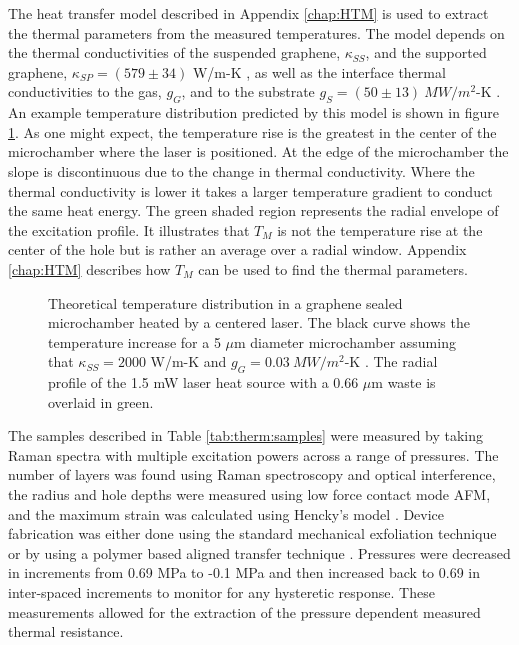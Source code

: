 The heat transfer model described in Appendix \ref{chap:HTM} is used to extract the thermal parameters from the measured temperatures.
The model depends on the thermal conductivities of the suspended graphene, $\kappa_{SS}$, and the supported graphene, $\kappa_{SP}=(579 \pm 34)$ W/m-K \cite{Seol2010}, as well as the interface thermal conductivities to the gas, $g_G$, and to the substrate $g_S=(50 \pm 13) \ MW/m^2$-K \cite{Mak2010}.
An example temperature distribution predicted by this model is shown in figure \ref{fig:therm:HTPlot}.
As one might expect, the temperature rise is the greatest in the center of the microchamber where the laser is positioned.
At the edge of the microchamber the slope is discontinuous due to the change in thermal conductivity.
Where the thermal conductivity is lower it takes a larger temperature gradient to conduct the same heat energy.
The green shaded region represents the radial envelope of the excitation profile.
It illustrates that $T_M$ is not the temperature rise at the center of the hole but is rather an average over a radial window.
Appendix \ref{chap:HTM} describes how $T_M$ can be used to find the thermal parameters.

\begin{figure}
	\begin{center}
	
	\end{center}
	\caption[Expected temperature distribution in a graphene sealed microchamber heated by a centered laser]
	{\label{fig:therm:HTPlot}
		Theoretical temperature distribution in a graphene sealed microchamber heated by a centered laser.
		The black curve shows the temperature increase for a 5 $\mu$m diameter microchamber assuming that $\kappa_{SS}=2000$ W/m-K and  $g_{G}=0.03 \ MW/m^2$-K \cite{Chen2011a}.
		The radial profile of the 1.5 mW laser heat source with a 0.66 $\mu$m waste is overlaid in green.
	}
\end{figure}

The samples described in Table \ref{tab:therm:samples} were measured by taking Raman spectra with multiple excitation powers across a range of pressures.
The number of layers was found using Raman spectroscopy and optical interference, the radius and hole depths were measured using low force contact mode AFM, and the maximum strain was calculated using Hencky's model \cite{Hencky1915}.
Device fabrication was either done using the standard mechanical exfoliation technique or by using a polymer based aligned transfer technique \cite{Goossens2013T}.
Pressures were decreased in increments from 0.69 MPa to -0.1 MPa and then increased back to 0.69 in inter-spaced increments to monitor for any hysteretic response.
These measurements allowed for the extraction of the pressure dependent measured thermal resistance.

